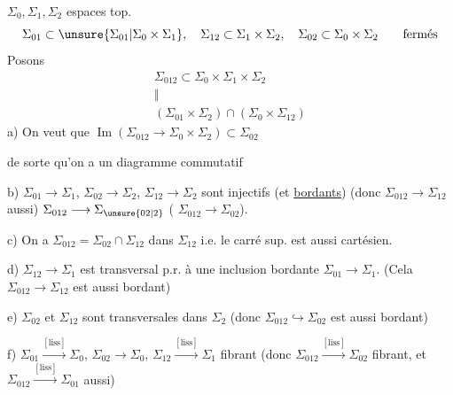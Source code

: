 $\Sigma_0,\Sigma_1,\Sigma_2$ espaces top.
\[
\Sigma_{01}\subset\unsure{\Sigma_{01}|\Sigma_0\times\Sigma_1},\quad
\Sigma_{12}\subset\Sigma_1\times\Sigma_2,\quad
\Sigma_{02}\subset\Sigma_0\times\Sigma_2\qquad\text{fermés}
\]
 Posons
\[
\begin{array}{c}
\Sigma_{012}\subset\Sigma_0\times\Sigma_1\times\Sigma_2\\
\Vert\\
(\Sigma_{01}\times\Sigma_2)\cap(\Sigma_0\times\Sigma_{12})
\end{array}
\]
a) On veut que $\operatorname{Im}(\Sigma_{012}\longrightarrow\Sigma_0\times\Sigma_2)\subset\Sigma_{02}$

de sorte qu'on a un diagramme commutatif

b) $\Sigma_{01}\longrightarrow\Sigma_1$, $\Sigma_{02}\longrightarrow\Sigma_2$, $\Sigma_{12}\longrightarrow\Sigma_2$ sont injectifs
(et \uline{bordants}) (donc $\Sigma_{012}\longrightarrow\Sigma_{12}$ aussi)
  $\Sigma_{012}\longrightarrow\Sigma_{\unsure{02|2}}$
  (\deleted{$\unsure{\Longleftrightarrow}$} $\Sigma_{012}\longrightarrow\Sigma_{02}$).

c) 
On a $\Sigma_{012}=\Sigma_{02}\cap\Sigma_{12}$ dans $\Sigma_{12}$ i.e.
le carré sup. est aussi cartésien.

d) $\Sigma_{12}\longrightarrow\Sigma_1$ est transversal p.r. à
une inclusion bordante $\Sigma_{01}\longrightarrow\Sigma_1$. (Cela 
$\Sigma_{012}\longrightarrow\Sigma_{12}$ est aussi bordant)

e) $\Sigma_{02}$ et $\Sigma_{12}$ sont  transversales dans $\Sigma_2$
(donc $\Sigma_{012}\hookrightarrow\Sigma_{02}$ est aussi bordant)

f) $\Sigma_{01}\xrightarrow{[\mathrm{liss}]}\Sigma_0$, $\Sigma_{02}\longrightarrow\Sigma_0$, $\Sigma_{12}\xrightarrow{[\mathrm{liss}]}\Sigma_1$ fibrant
(donc $\Sigma_{012}\xrightarrow{[\mathrm{liss}]}\Sigma_{02}$ fibrant,  et $\Sigma_{012}\xrightarrow{[\mathrm{liss}]}\Sigma_{01}$ aussi)

